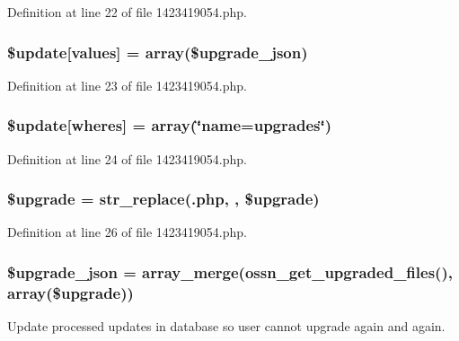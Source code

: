 Definition at line 22 of file 1423419054.\+php.

\subsubsection[{\texorpdfstring{\$update}{$update}}]{\setlength{\rightskip}{0pt plus 5cm}\${\bf update}\mbox{[}\textquotesingle{}values\textquotesingle{}\mbox{]} = array(\$upgrade\+\_\+json)}\hypertarget{1423419054_8php_ac82a75b4c6df37380ff77c88f041785e}{}\label{1423419054_8php_ac82a75b4c6df37380ff77c88f041785e}


Definition at line 23 of file 1423419054.\+php.

\subsubsection[{\texorpdfstring{\$update}{$update}}]{\setlength{\rightskip}{0pt plus 5cm}\${\bf update}\mbox{[}\textquotesingle{}wheres\textquotesingle{}\mbox{]} = array(\char`\"{}name=\textquotesingle{}upgrades\textquotesingle{}\char`\"{})}\hypertarget{1423419054_8php_aacde4479a904b32d0f24dea4e01f148c}{}\label{1423419054_8php_aacde4479a904b32d0f24dea4e01f148c}


Definition at line 24 of file 1423419054.\+php.

\subsubsection[{\texorpdfstring{\$upgrade}{$upgrade}}]{\setlength{\rightskip}{0pt plus 5cm}\$upgrade = str\+\_\+replace(\textquotesingle{}.php\textquotesingle{}, \textquotesingle{}\textquotesingle{}, \$upgrade)}\hypertarget{1423419054_8php_a9084097ce600d3cc7a79a20ecaea9906}{}\label{1423419054_8php_a9084097ce600d3cc7a79a20ecaea9906}


Definition at line 26 of file 1423419054.\+php.

\subsubsection[{\texorpdfstring{\$upgrade\+\_\+json}{$upgrade_json}}]{\setlength{\rightskip}{0pt plus 5cm}\$upgrade\+\_\+json = array\+\_\+merge({\bf ossn\+\_\+get\+\_\+upgraded\+\_\+files}(), array(\$upgrade))}\hypertarget{1423419054_8php_a512525d0f5eb608ac72ca7b85e5fbf65}{}\label{1423419054_8php_a512525d0f5eb608ac72ca7b85e5fbf65}
Update processed updates in database so user cannot upgrade again and again.

